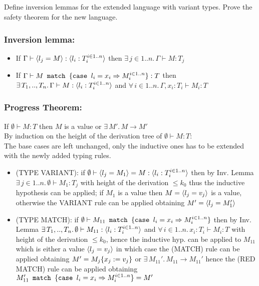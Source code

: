 \subsection{}

Define inversion lemmas for the extended language with variant types. Prove the safety theorem
for the new language.

\subsubsection*{Inversion lemma:}

\begin{itemize}
	\item If $\Gamma \vdash \langle l_j = M \rangle: \langle l_i: T_i^{i \in 1..n} \rangle$ then
	      $\exists\, j \in 1..n.\, \Gamma \vdash M: T_j$
	\item If $\Gamma \vdash M\texttt{ match }\{\texttt{case }l_i = x_i \Rightarrow M_i^{i \in 1..n}\}: T$ then
	      $\exists\, T_1,..,T_n.\, \Gamma \vdash M: \langle l_i: T_i^{i \in 1..n} \rangle$
	      and $\forall\, i \in 1..n.\, \Gamma, x_i: T_i \vdash M_i: T$
\end{itemize}


\subsubsection*{Progress Theorem:}

If $\emptyset \vdash M: T$ then $M$ is a value or $\exists\, M'.\, M \to M'$\\
By induction on the height of the derivation tree of $\emptyset \vdash M: T$:\\
The base cases are left unchanged, only the inductive ones has to be extended with the newly
added typing rules.
\begin{itemize}
	\item (TYPE VARIANT): if $\emptyset \vdash \langle l_j = M_1 \rangle = M: \langle l_i:T_i^{i \in 1..n} \rangle$
	      then by Inv. Lemma $\exists\, j \in 1..n.\, \emptyset \vdash M_1: T_j$ with height of
	      the derivation $\le k_0$ thus the inductive hypothesis can be applied; if $M_1$ is a
	      value then $M = \langle l_j = v_j \rangle$ is a value, otherwise the VARIANT rule can be applied
	      obtaining $M' = \langle l_j = M_1' \rangle$
	\item (TYPE MATCH): if $\emptyset \vdash M_{11}\texttt{ match }\{\texttt{case }l_i = x_i \Rightarrow M_i^{i \in 1..n}\}$ then
	      by Inv. Lemma $\exists\, T_1,..,T_n.\, \emptyset \vdash M_{11}: \langle l_i: T_i^{i \in 1..n} \rangle$ and
	      $\forall\, i \in 1..n.\, x_i: T_i \vdash M_i: T$ with height of the derivation
	      $\le k_0$, hence the inductive hyp. can be applied to $M_{11}$ which is either a value
	      $\langle l_j = v_j \rangle$ in which case the (MATCH) rule can be applied obtaining
	      $M' = M_j\{x_j:=v_j\}$ or $\exists\, M_{11}'.\, M_{11} \to M_{11}'$ hence the
	      (RED MATCH) rule can be applied obtaining
	      $M_{11}'\texttt{ match }\{\texttt{case }l_i = x_i \Rightarrow M_i^{i \in 1..n}\} = M'$
\end{itemize}


